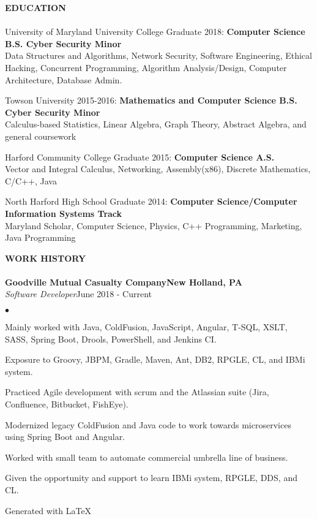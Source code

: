 \documentclass{article}
\newcommand{\lineunder}{
	\vspace*{-4pt}\\ 
	\hspace*{-18pt}\hrulefill \\
}
\newcommand{\header}[1]{
	{\hspace*{-15pt}\vspace*{6pt}\textsc{#1}}\vspace*{-6pt}\lineunder
}
\newcommand{\employer}[5]{
	{\textbf{#1}{\hfill\textbf{#2}}\\ 
	{{\emph{#3}}}\hfill {#4}\\ \hfill {#5}}
}
\newcommand{\education}[3]{
	{#1} \textbf{#2}\\
	{\hspace*{12pt}#3 }\\ 
	\vspace*{5pt}
}
\newenvironment{resumecontent}{
	\begin{list}
		{\small$\bullet$}{\topsep 0pt \itemsep -2pt}}{\vspace*{4pt}
	\end{list}
}
\newcommand{\resumeheader}[1]{
	\vspace*{5pt}
	\header{\textbf{#1}}
}
\begin{document}
	\resumeheader{EDUCATION}
		\education
			{University of Maryland University College Graduate 2018:} 
			{Computer Science B.S. Cyber Security Minor}
			{Data Structures and Algorithms, Network Security, Software Engineering, Ethical Hacking, Concurrent
			\hspace*{12pt}Programming, Algorithm Analysis/Design, Computer Architecture, Database Admin.}
		\education
			{Towson University 2015-2016:} 
			{Mathematics and Computer Science B.S. Cyber Security Minor}
			{Calculus-based Statistics, Linear Algebra, Graph Theory, Abstract Algebra, and general coursework}
		\education
			{Harford Community College Graduate 2015:}
			{Computer Science A.S.}
			{Vector and Integral Calculus, Networking, Assembly(x86), Discrete Mathematics, C/C++, Java}
		\education
			{North Harford High School Graduate 2014:} 
			{Computer Science/Computer Information Systems Track}
			{Maryland Scholar, Computer Science, Physics, C++ Programming, Marketing, Java Programming}

	\resumeheader{WORK HISTORY}
		\employer{Goodville Mutual Casualty Company}{New Holland, PA}{Software Developer} {June 2018 - Current} {}
			\vspace*{-8pt}
			\begin{resumecontent}
				\item Mainly worked with Java, ColdFusion, JavaScript, Angular, T-SQL, XSLT, SASS, Spring Boot, Drools, PowerShell, and Jenkins CI.
				\item Exposure to Groovy, JBPM, Gradle, Maven, Ant, DB2, RPGLE, CL, and IBMi system.
				\item Practiced Agile development with scrum and the Atlassian suite (Jira, Confluence, Bitbucket, FishEye).
				\item Modernized legacy ColdFusion and Java code to work towards microservices using Spring Boot and Angular.
				\item Worked with small team to automate commercial umbrella line of business.
				\item Given the opportunity and support to learn IBMi system, RPGLE, DDS, and CL.
			\end{resumecontent}

	\begin{center}
		\small 
		\vspace*{18pt} Generated with \LaTeX
	\end{center}
\end{document}
